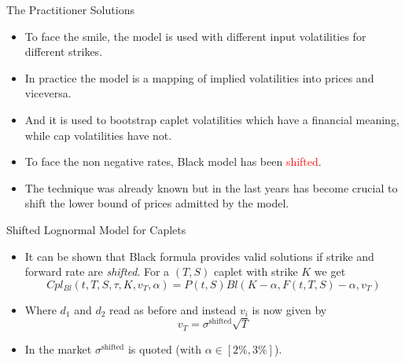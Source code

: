 \documentclass{beamer}
\begin{document}
\begin{frame}{The Practitioner Solutions}
	\begin{itemize}
		\item To face the smile, the model is used with different input volatilities for different strikes.
		\item In practice the model is a mapping of implied volatilities into prices and viceversa.
		\item And it is used to bootstrap caplet volatilities which have a financial meaning, while cap volatilities have not.
		\item To face the non negative rates, Black model has been \textcolor{red}{shifted}.
		\item The technique was already known but in the last years has become crucial to shift the lower bound of prices admitted by the model.
	\end{itemize}
\end{frame}

\begin{frame}{Shifted Lognormal Model for Caplets}
	\begin{itemize}
		\item It can be shown that Black formula provides valid solutions if strike and forward rate are \emph{shifted}. For a $(T,S)$ caplet with strike $K$ we get
		\begin{equation}
			Cpl_{Bl}(t,T,S,\tau,K,v_T,\alpha) = P(t,S) Bl(K-\alpha,F(t,T,S)-\alpha,v_T)
		\end{equation}
		\item Where $d_1$ and $d_2$ read as before and instead $v_i$ is now given by
		\begin{equation*}
			v_T = \sigma^{\text{shifted}}\sqrt{T}
		\end{equation*}
		\item In the market $\sigma^{\text{shifted}}$ is quoted (with $\alpha \in [2\%,3\%]$).
	\end{itemize}
\end{frame}
\end{document}
